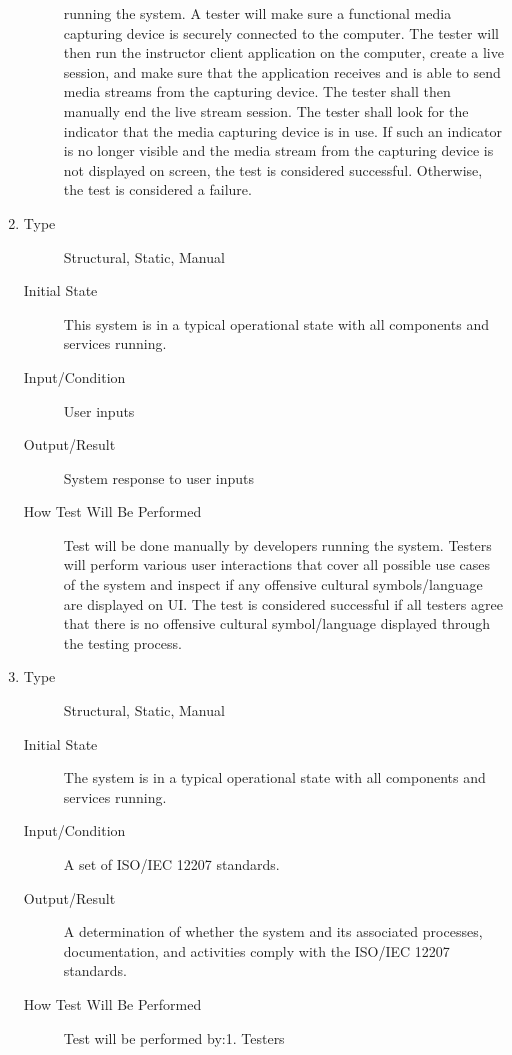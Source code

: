 \documentclass[12pt, titlepage]{article}
\begin{document}
\begin{enumerate}[NFR-T1]
\begin{description}
    running the system. A tester will make sure a functional media capturing
    device is securely connected to the computer. The tester will then run the
    instructor client application on the computer, create a live session, and
    make sure that the application receives and is able to send media streams
    from the capturing device. The tester shall then manually end the live
    stream session. The tester shall look for the indicator that the media
    capturing device is in use. If such an indicator is no longer visible and
    the media stream from the capturing device is not displayed on screen, the
    test is considered successful. Otherwise, the test is considered a failure.
  \end{description}
\item \label{NFRT27}
  \begin{description}
  \item[Type] Structural, Static, Manual
  \item[Initial State] This system is in a typical operational state with all
    components and services running.
  \item[Input/Condition] User inputs
  \item[Output/Result] System response to user inputs
  \item[How Test Will Be Performed] Test will be done manually by developers
    running the system. Testers will perform various user interactions that
    cover all possible use cases of the system and inspect if any offensive
    cultural symbols/language are displayed on UI. The test is considered
    successful if all testers agree that there is no offensive cultural
    symbol/language displayed through the testing process.
  \end{description}
\item \label{NFRT28}
  \begin{description}
  \item[Type] Structural, Static, Manual
  \item[Initial State] The system is in a typical operational state with all
    components and services running.
  \item[Input/Condition] A set of ISO/IEC 12207 standards.
  \item[Output/Result] A determination of whether the system and its associated
    processes, documentation, and activities comply with the ISO/IEC 12207
    standards.
  \item[How Test Will Be Performed] Test will be performed by:1. Testers

\end{description}
\end{enumerate}
\end{document}
